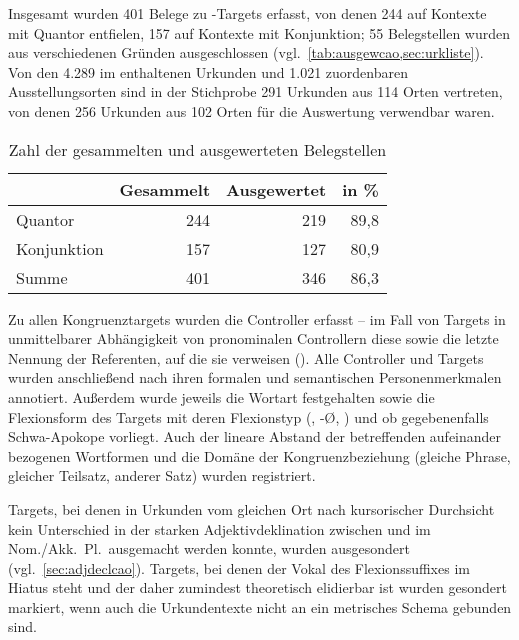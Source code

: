 \label{phsec:caohiatus}
Insgesamt wurden 401 Belege zu -Targets erfasst, von denen 244 auf
Kontexte mit Quantor entfielen, 157 auf Kontexte mit Konjunktion; 55
Belegstellen wurden aus verschiedenen Gründen ausgeschlossen
(vgl.~\cref{tab:ausgewcao,sec:urkliste}). Von den 4.289 im \CAO{}
enthaltenen Urkunden und 1.021 zuordenbaren Ausstellungsorten sind in der
Stichprobe 291 Urkunden aus 114 Orten vertreten, von denen 256 Urkunden aus 102
Orten für die Auswertung verwendbar waren.

\begin{table}
\centering
\caption{Zahl der gesammelten und ausgewerteten Belegstellen}
\begin{tabular}{l r r r}
\toprule

%
	& \bfseries Gesammelt
	& \bfseries Ausgewertet
	& \bfseries in \%
	\\

\midrule


Quantor
	& 244 %
	& 219 %
	& 89,8 %
	\\

Konjunktion
	& 157 %
	& 127 %
	& 80,9 %
	\\

\midrule

Summe
	& 401 %
	& 346 %
	& 86,3 %
	\\

\bottomrule
\end{tabular}
\label{tab:ausgewcao}
\end{table}

Zu allen Kongruenztargets wurden die Controller erfasst -- im Fall von Targets
in unmittelbarer Abhängigkeit von pronominalen Controllern diese sowie die
letzte Nennung der Referenten, auf die sie verweisen ().
Alle Controller und Targets wurden anschließend nach ihren formalen und
semantischen Personenmerkmalen annotiert. Außerdem wurde jeweils die Wortart
festgehalten sowie die Flexionsform des Targets mit deren Flexionstyp
(, -Ø, ) und ob gegebenenfalls Schwa-Apokope vorliegt. Auch
der lineare Abstand der betreffenden aufeinander bezogenen Wortformen und die
Domäne der Kongruenzbeziehung (gleiche Phrase, gleicher Teilsatz, anderer Satz)
wurden registriert.

Targets, bei denen in Urkunden vom gleichen Ort nach kursorischer Durchsicht
kein Unterschied in der starken Adjektivdeklination zwischen  und
 im Nom./Akk.~Pl.\ ausgemacht werden konnte, wurden ausgesondert
(vgl.~\cref{sec:adjdeclcao}). Targets, bei denen der Vokal des Flexionssuffixes
im Hiatus steht und der daher zumindest theoretisch elidierbar ist
\autocites[vgl.][90--91]{askedal1973}[191]{gjelsten1980} wurden gesondert
markiert, wenn auch die Urkundentexte nicht an ein metrisches Schema gebunden
sind.

